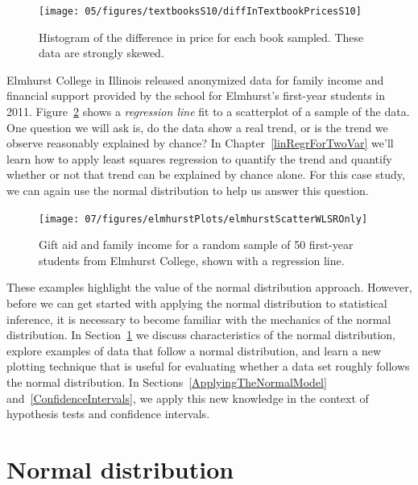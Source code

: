 \begin{figure}[ht]
\centering
\texttt{[image: 05/figures/textbooksS10/diffInTextbookPricesS10]}
\caption{Histogram of the difference in price for each book sampled. These data are strongly skewed.}
\label{diffInTextbookPricesS10_CLTsection}
\end{figure}

\begin{example}{Elmhurst College in Illinois released anonymized data for family income and financial support provided by the school for Elmhurst's first-year students in 2011. Figure~\ref{elmhurstScatterWLSROnly_CLTsection} shows a \emph{regression line} fit to a scatterplot of a sample of the data. One question we will ask is, do the data show a real trend, or is the trend we observe reasonably explained by chance?}
In Chapter~\ref{linRegrForTwoVar} we'll learn how to apply least squares regression to quantify the trend and quantify whether or not that trend can be explained by chance alone. For this case study, we can again use the normal distribution to help us answer this question.
\end{example}

\begin{figure}[ht]
\centering
\texttt{[image: 07/figures/elmhurstPlots/elmhurstScatterWLSROnly]}
\caption{Gift aid and family income for a random sample of 50 first-year students from Elmhurst College, shown with a regression line.}
\label{elmhurstScatterWLSROnly_CLTsection}
\end{figure}

These examples highlight the value of the normal distribution approach. However, before we can get started with applying the normal distribution to statistical inference, it is necessary to become familiar with the mechanics of the normal distribution. In Section~\ref{normalDist} we discuss characteristics of the normal distribution, explore examples of data that follow a normal distribution, and learn a new plotting technique that is useful for evaluating whether a data set roughly follows the normal distribution. In Sections~\ref{ApplyingTheNormalModel} and~\ref{ConfidenceIntervals}, we apply this new knowledge in the context of hypothesis tests and confidence intervals.


\section{Normal distribution}
\label{normalDist}

